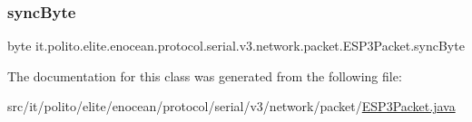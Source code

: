 \hypertarget{classit_1_1polito_1_1elite_1_1enocean_1_1protocol_1_1serial_1_1v3_1_1network_1_1packet_1_1_e_s_p3_packet_ac04a320a5909485e10a72fd181a69756}{}\label{classit_1_1polito_1_1elite_1_1enocean_1_1protocol_1_1serial_1_1v3_1_1network_1_1packet_1_1_e_s_p3_packet_ac04a320a5909485e10a72fd181a69756} 
\subsubsection{\texorpdfstring{sync\+Byte}{syncByte}}
{\footnotesize\ttfamily byte it.\+polito.\+elite.\+enocean.\+protocol.\+serial.\+v3.\+network.\+packet.\+E\+S\+P3\+Packet.\+sync\+Byte\hspace{0.3cm}{\ttfamily [protected]}}



The documentation for this class was generated from the following file\+:\begin{DoxyCompactItemize}
\item 
src/it/polito/elite/enocean/protocol/serial/v3/network/packet/\hyperlink{_e_s_p3_packet_8java}{E\+S\+P3\+Packet.\+java}\end{DoxyCompactItemize}

